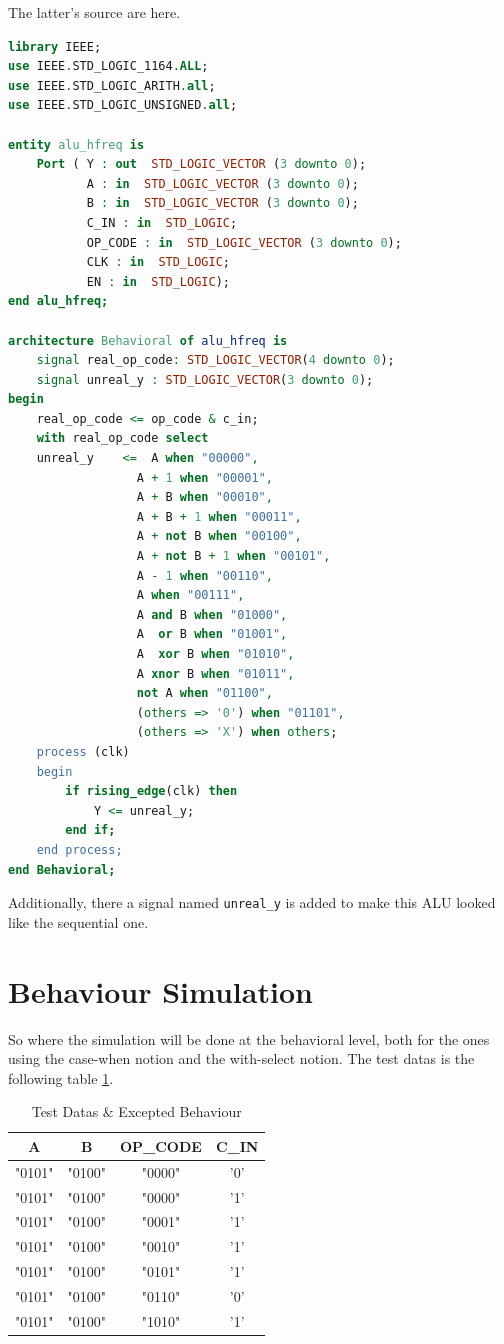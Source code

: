 \documentclass{article}
\begin{document}
    The latter's source are here.
    \begin{lstlisting}[language=VHDL]
library IEEE;
use IEEE.STD_LOGIC_1164.ALL;
use IEEE.STD_LOGIC_ARITH.all;
use IEEE.STD_LOGIC_UNSIGNED.all;

entity alu_hfreq is
    Port ( Y : out  STD_LOGIC_VECTOR (3 downto 0);
           A : in  STD_LOGIC_VECTOR (3 downto 0);
           B : in  STD_LOGIC_VECTOR (3 downto 0);
           C_IN : in  STD_LOGIC;
           OP_CODE : in  STD_LOGIC_VECTOR (3 downto 0);
           CLK : in  STD_LOGIC;
           EN : in  STD_LOGIC);
end alu_hfreq;

architecture Behavioral of alu_hfreq is
	signal real_op_code: STD_LOGIC_VECTOR(4 downto 0);
	signal unreal_y : STD_LOGIC_VECTOR(3 downto 0);
begin
	real_op_code <= op_code & c_in;
	with real_op_code select
	unreal_y	<=	A when "00000",
				  A + 1 when "00001",
				  A + B when "00010",
				  A + B + 1 when "00011",
				  A + not B when "00100",
				  A + not B + 1 when "00101",
				  A - 1 when "00110",
				  A when "00111",
				  A and B when "01000",
				  A  or B when "01001",
				  A  xor B when "01010",
				  A xnor B when "01011",
				  not A when "01100",
				  (others => '0') when "01101",
				  (others => 'X') when others;
	process (clk)
	begin
		if rising_edge(clk) then
			Y <= unreal_y;
		end if;
	end process;
end Behavioral;
    \end{lstlisting}
    
    Additionally, there a signal named \verb|unreal_y| is added to make this ALU looked like the sequential one.

    \section{Behaviour Simulation}
    \label{sec:simu:be}

    So where the simulation will be done at the behavioral level, both for the ones using the case-when notion and 
    the with-select notion.
    The test datas is the following table \ref{tab:testdatas}.

    \begin{table}
      \centering
      \begin{tabular}{|c|c|c|c|}
        \hline
        A & B & OP\_CODE & C\_IN \\
        \hline
        "0101" & "0100" & "0000" & '0' \\
        \hline
        "0101" & "0100" & "0000" & '1' \\
        \hline
        "0101" & "0100" & "0001" & '1' \\
        \hline
        "0101" & "0100" & "0010" & '1' \\
        \hline
        "0101" & "0100" & "0101" & '1' \\
        \hline
        "0101" & "0100" & "0110" & '0' \\
        \hline
        "0101" & "0100" & "1010" & '1' \\
        \hline
      \end{tabular}
      \caption{Test Datas \& Excepted Behaviour}
      \label{tab:testdatas}
    \end{table}
\end{document}
